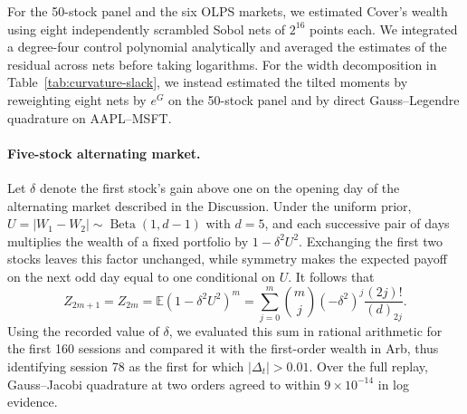 \documentclass{article}
\numberwithin{equation}{section}
\theoremstyle{remark}
\newcommand{\E}{\mathbb E}
\begin{document}
For the 50-stock panel and the six OLPS markets, we estimated Cover's
wealth using eight independently scrambled Sobol nets of $2^{16}$ points
each. We integrated a degree-four control polynomial analytically and
averaged the estimates of the residual across nets before taking logarithms.
For the width decomposition in Table~\ref{tab:curvature-slack}, we instead
estimated the tilted moments by reweighting eight nets by $e^G$ on the
50-stock panel and by direct Gauss--Legendre quadrature on AAPL--MSFT.

\paragraph{Five-stock alternating market.}
Let $\delta$ denote the first stock's gain above one on the opening day
of the alternating market described in the Discussion.
Under the uniform prior, $U=|W_1-W_2|\sim\operatorname{Beta}(1,d-1)$
with $d=5$, and each successive pair of days multiplies the wealth of
a fixed portfolio by $1-\delta^2 U^2$. Exchanging the first two stocks
leaves this factor unchanged, while symmetry makes the expected payoff
on the next odd day equal to one conditional on $U$. It follows that
\[
  Z_{2m+1}=Z_{2m}=\E(1-\delta^2 U^2)^m
    =\sum_{j=0}^m \binom{m}{j}(-\delta^2)^j\frac{(2j)!}{(d)_{2j}}.
\]
Using the recorded value of $\delta$, we evaluated this sum in
rational arithmetic for the first 160 sessions and compared it with
the first-order wealth in Arb, thus identifying session 78 as the
first for which $|\Delta_t|>0.01$. Over the full replay, Gauss--Jacobi
quadrature at two orders agreed to within $9\times10^{-14}$ in log evidence.
\end{document}
